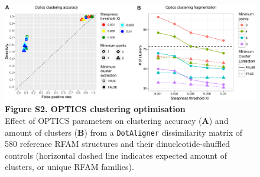 \documentclass{bmcart}
\newcommand\dotaligner{\texttt{DotAligner}}
\begin{document}
\begin{figure}
 \includegraphics[width=\textwidth]{SF2}
 \caption*{ \textbf{ Figure S2. OPTICS clustering optimisation }\\
Effect of OPTICS parameters on clustering accuracy (\textbf{A}) and amount 
 of clusters (\textbf{B}) from a \dotaligner{} dissimilarity matrix of 580 reference RFAM 
 structures and their dinucleotide-shuffled controls (horizontal dashed line indicates 
 expected amount of clusters, or unique RFAM families). }
\end{figure}
\end{document}
